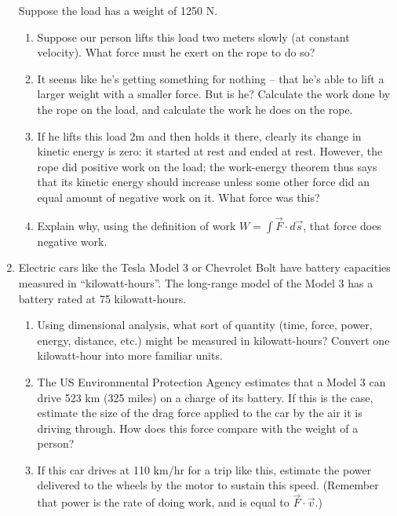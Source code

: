\documentclass[12pt]{article}
\begin{document}
\begin{enumerate}
{       Suppose the load has a weight of 1250 N. 

       \begin{enumerate}
         \item{Suppose our person lifts this load two meters slowly (at constant velocity). What force must he exert on the rope to do so?} 
         \item{It seems like he's getting something for nothing -- that he's able to lift a larger weight with a smaller force. But is he? Calculate the work done by the rope on the load, and calculate the work he does on the rope.}
         \item{If he lifts this load 2m and then holds it there, clearly its change in kinetic energy is zero: it started at rest and ended at rest. However, the rope did positive work on the load; the work-energy theorem thus says that its kinetic energy should
             increase unless some other force did an equal amount of negative work on it. What force was this?}
         \item{Explain why, using the definition of work $W = \int \vec F \cdot d\vec s$, that force does negative work.}
       \end{enumerate}
     }

\item Electric cars like the Tesla Model 3 or Chevrolet Bolt have battery capacities measured in ``kilowatt-hours''. The long-range model of the Model 3 has a battery rated at 75 kilowatt-hours. 
\begin{enumerate}
\item Using dimensional analysis, what sort of quantity (time, force, power, energy, distance, etc.) might be measured in kilowatt-hours? Convert one kilowatt-hour into more familiar units.
\item The US Environmental Protection Agency estimates that a Model 3 can drive 523 km (325 miles) on a charge of its battery. If this is the case, estimate the size of the drag force applied to the car by the air it is driving through. How does this force
compare with the weight of a person?
\item If this car drives at 110 km/hr for a trip like this, estimate the power delivered to the wheels by the motor to sustain
this speed. (Remember that power is the rate of doing work, and is equal to $\vec F \cdot \vec v$.)
\end{enumerate}


\end{enumerate}
\end{document}
